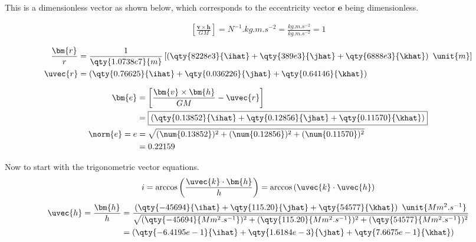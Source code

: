 \documentclass{article}
\begin{document}
{	This is a dimensionless vector as shown below, which corresponds to the eccentricity vector $\bm{e}$ being dimensionless.
	
	\begin{equation*}
		\begin{split}
			\left[ \frac{\bm{v} \times \bm{h}}{GM} \right] = \unit{N^{-1}.kg.m.s^{-2}} = \frac{\unit{kg.m.s^{-2}}}{\unit{kg.m.s^{-2}}} = 1
		\end{split}
	\end{equation*}
	
	\begin{equation*}
		\begin{split}
			\frac{\bm{r}}{r} &= \frac{1}{\qty{1.0738e7}{m}} \left[ \left( \qty{8228e3}{\ihat} + \qty{389e3}{\jhat} + \qty{6888e3}{\khat} \right) \ \unit{m} \right] \\
			\uvec{r} &= \left( \qty{0.76625}{\ihat} + \qty{0.036226}{\jhat} + \qty{0.64146}{\khat} \right) \\
		\end{split}
	\end{equation*}
	
	\begin{equation*}
		\begin{split}
			\bm{e} &= \left[ \frac{\bm{v} \times \bm{h}}{GM} - \uvec{r} \right] \\
			&= \boxed{\left( \qty{0.13852}{\ihat} + \qty{0.12856}{\jhat} + \qty{0.11570}{\khat} \right)} \\
			\norm{e} = e &= \sqrt{ (\num{0.13852})^2 + (\num{0.12856})^2 + (\num{0.11570})^2 } \\
			&= 0.22159
		\end{split}
	\end{equation*}
	
	Now to start with the trigonometric vector equations. \\
	
	\[
		i = \arccos \left( \frac{\uvec{k} \cdot \bm{h}}{h} \right) = \arccos \left( \uvec{k} \cdot \uvec{h} \right)
	\]
	\begin{equation*}
		\begin{split}
			\uvec{h} = \frac{\bm{h}}{h} &= \frac{\left( \qty{-45694}{\ihat} + \qty{115.20}{\jhat} + \qty{54577}{\khat} \right) \ \unit{Mm^2.s^{-1}}}{\sqrt{ (\qty{-45694}{Mm^2.s^{-1}})^2 + (\qty{115.20}{Mm^2.s^{-1}})^2 + (\qty{54577}{Mm^2.s^{-1}})^2 }} \\
			&= \left( \qty{-6.4195e-1}{\ihat} + \qty{1.6184e-3}{\jhat} + \qty{7.6675e-1}{\khat} \right)
		\end{split}
	\end{equation*}

}
\end{document}
